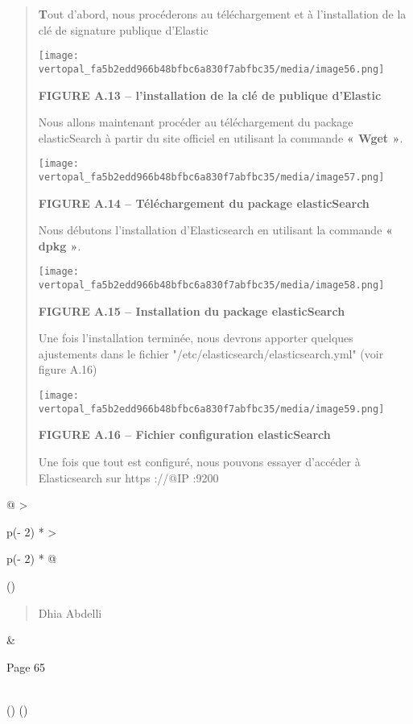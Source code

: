 \documentclass[
]{article}
\begin{document}
\begin{quote}
\textbf{T}out d'abord, nous procéderons au téléchargement et à
l'installation de la clé de signature publique d'Elastic

\texttt{[image: vertopal\_fa5b2edd966b48bfbc6a830f7abfbc35/media/image56.png]}

\textbf{FIGURE A.13 -- l'installation de la clé de publique d'Elastic}

Nous allons maintenant procéder au téléchargement du package
elasticSearch à partir du site officiel en utilisant la commande
\textbf{« Wget »}.

\texttt{[image: vertopal\_fa5b2edd966b48bfbc6a830f7abfbc35/media/image57.png]}

\textbf{FIGURE A.14 -- Téléchargement du package elasticSearch}

Nous débutons l'installation d'Elasticsearch en utilisant la commande
\textbf{« dpkg »}.

\texttt{[image: vertopal\_fa5b2edd966b48bfbc6a830f7abfbc35/media/image58.png]}

\textbf{FIGURE A.15 -- Installation du package elasticSearch}

Une fois l'installation terminée, nous devrons apporter quelques
ajustements dans le fichier "/etc/elasticsearch/elasticsearch.yml" (voir
figure A.16)

\texttt{[image: vertopal\_fa5b2edd966b48bfbc6a830f7abfbc35/media/image59.png]}

\textbf{FIGURE A.16 -- Fichier configuration elasticSearch}

Une fois que tout est configuré, nous pouvons essayer d'accéder à
Elasticsearch sur https ://@IP :9200
\end{quote}

\begin{longtable}[]{@{}
  >{\raggedright\arraybackslash}p{(\columnwidth - 2\tabcolsep) * }
  >{\raggedright\arraybackslash}p{(\columnwidth - 2\tabcolsep) * }@{}}
\toprule()
\begin{minipage}[b]{\linewidth}\raggedright
\begin{quote}
Dhia Abdelli
\end{quote}
\end{minipage} & \begin{minipage}[b]{\linewidth}\raggedright
Page 65
\end{minipage} \\
\midrule()
\endhead
\bottomrule()
\end{longtable}
\end{document}
